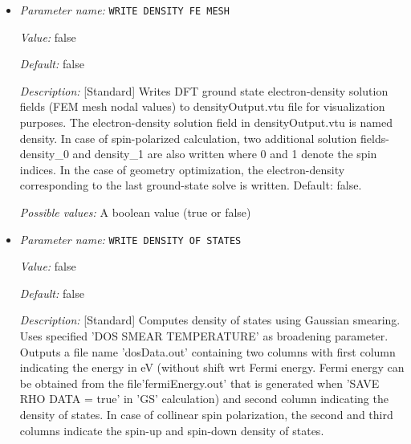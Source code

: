 \begin{itemize}
{\it Value:} false


{\it Default:} false


{\it Description:} [Standard] Read atomic wavefunctons from the pseudopotential file for computing projected density of states. When set to false atomic wavefunctions from the internal database are read, which correspond to sg15 ONCV pseudopotentials.


{\it Possible values:} A boolean value (true or false)
\item {\it Parameter name:} {\tt WRITE DENSITY FE MESH}
\label{parameters:Post_2dprocessing Options/WRITE DENSITY FE MESH}
\label{parameters:Post_2dprocessing_20Options/WRITE_20DENSITY_20FE_20MESH}


{\it Value:} false


{\it Default:} false


{\it Description:} [Standard] Writes DFT ground state electron-density solution fields (FEM mesh nodal values) to densityOutput.vtu file for visualization purposes. The electron-density solution field in densityOutput.vtu is named density. In case of spin-polarized calculation, two additional solution fields- density\_0 and density\_1 are also written where 0 and 1 denote the spin indices. In the case of geometry optimization, the electron-density corresponding to the last ground-state solve is written. Default: false.


{\it Possible values:} A boolean value (true or false)
\item {\it Parameter name:} {\tt WRITE DENSITY OF STATES}
\label{parameters:Post_2dprocessing Options/WRITE DENSITY OF STATES}
\label{parameters:Post_2dprocessing_20Options/WRITE_20DENSITY_20OF_20STATES}


{\it Value:} false


{\it Default:} false


{\it Description:} [Standard] Computes density of states using Gaussian smearing. Uses specified 'DOS SMEAR TEMPERATURE' as broadening parameter. Outputs a file name 'dosData.out' containing two columns with first column indicating the energy in eV (without shift wrt Fermi energy. Fermi energy can be obtained from the file'fermiEnergy.out' that is generated when 'SAVE RHO DATA = true' in 'GS' calculation) and second column indicating the density of states. In case of collinear spin polarization, the second and third columns indicate the spin-up and spin-down density of states.



\end{itemize}
